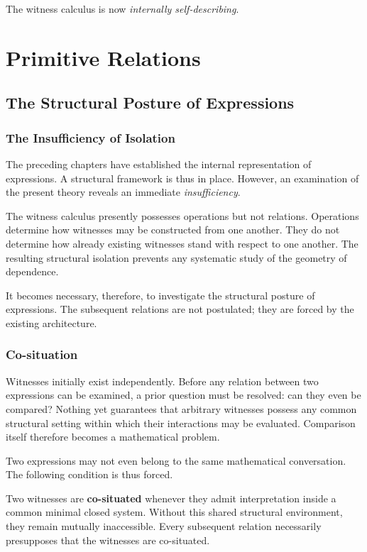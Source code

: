 \documentclass[12pt,anyside]{book}
\begin{document}
The witness calculus is now \textit{internally self-describing}.

\chapter{Primitive Relations}
\setlength{\parindent}{0pt}

\section{The Structural Posture of Expressions}

\subsection{The Insufficiency of Isolation}
The preceding chapters have established the internal representation of expressions. A structural framework is thus in place. However, an examination of the present theory reveals an immediate \textit{insufficiency}. 

The witness calculus presently possesses operations but not relations. Operations determine how witnesses may be constructed from one another. They do not determine how already existing witnesses stand with respect to one another. The resulting structural isolation prevents any systematic study of the geometry of dependence. 

It becomes necessary, therefore, to investigate the structural posture of expressions. The subsequent relations are not postulated; they are forced by the existing architecture. 

\subsection{Co-situation}
Witnesses initially exist independently. Before any relation between two expressions can be examined, a prior question must be resolved: can they even be compared? Nothing yet guarantees that arbitrary witnesses possess any common structural setting within which their interactions may be evaluated. Comparison itself therefore becomes a mathematical problem.

Two expressions may not even belong to the same mathematical conversation. The following condition is thus forced.

Two witnesses are \textbf{co-situated} whenever they admit interpretation inside a common minimal closed system. Without this shared structural environment, they remain mutually inaccessible. Every subsequent relation necessarily presupposes that the witnesses are co-situated. 
\end{document}

